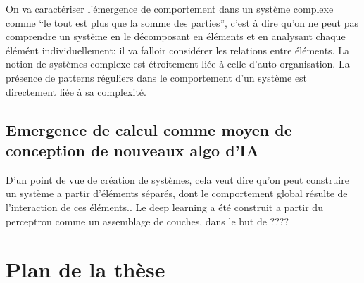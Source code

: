 \documentclass[../main]{subfiles}
\begin{document}
On va caractériser l'émergence de comportement dans un système complexe comme “le tout est plus que la somme des parties”, c'est à dire qu'on ne peut pas comprendre un système en le décomposant en éléments et en analysant chaque élémént individuellement: il va falloir considérer les relations entre éléments. 
La notion de systèmes complexe est étroitement liée à celle d'auto-organisation. La présence de patterns réguliers dans le comportement d'un système est directement liée à sa complexité.

\subsection*{Emergence de calcul comme moyen de conception de nouveaux algo d'IA}

D'un point de vue de création de systèmes, cela veut dire qu'on peut construire un système a partir d'éléments séparés, dont le comportement global résulte de l'interaction de ces éléments..
Le deep learning a été construit a partir du perceptron comme un assemblage de couches, dans le but de ????

\section*{ Plan de la thèse}
\end{document}

